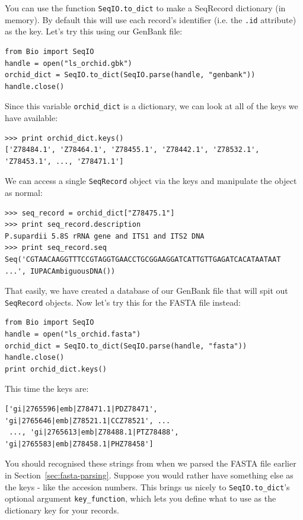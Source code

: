\documentclass{report}
\begin{document}
You can use the function \verb|SeqIO.to_dict| to make a SeqRecord dictionary (in memory).  By default this will use each record's identifier (i.e. the \verb|.id| attribute) as the key.  Let's try this using our GenBank file:

\begin{verbatim}
from Bio import SeqIO
handle = open("ls_orchid.gbk")
orchid_dict = SeqIO.to_dict(SeqIO.parse(handle, "genbank"))
handle.close()
\end{verbatim} 

Since this variable \verb|orchid_dict| is a dictionary, we can look at all of the keys we have available:

\begin{verbatim}
>>> print orchid_dict.keys()
['Z78484.1', 'Z78464.1', 'Z78455.1', 'Z78442.1', 'Z78532.1', 'Z78453.1', ..., 'Z78471.1']
\end{verbatim} 

We can access a single \verb|SeqRecord| object via the keys and manipulate the object as normal:

\begin{verbatim}
>>> seq_record = orchid_dict["Z78475.1"]
>>> print seq_record.description
P.supardii 5.8S rRNA gene and ITS1 and ITS2 DNA
>>> print seq_record.seq
Seq('CGTAACAAGGTTTCCGTAGGTGAACCTGCGGAAGGATCATTGTTGAGATCACATAATAAT ...', IUPACAmbiguousDNA())
\end{verbatim}

That easily, we have created a database of our GenBank file that will spit out \verb|SeqRecord| objects.  Now let's try this for the FASTA file instead:

\begin{verbatim}
from Bio import SeqIO
handle = open("ls_orchid.fasta")
orchid_dict = SeqIO.to_dict(SeqIO.parse(handle, "fasta"))
handle.close()
print orchid_dict.keys()
\end{verbatim} 

This time the keys are:

\begin{verbatim}
['gi|2765596|emb|Z78471.1|PDZ78471', 'gi|2765646|emb|Z78521.1|CCZ78521', ...
 ..., 'gi|2765613|emb|Z78488.1|PTZ78488', 'gi|2765583|emb|Z78458.1|PHZ78458']
\end{verbatim} 

You should recognised these strings from when we parsed the FASTA file earlier in Section~\ref{sec:fasta-parsing}.  Suppose you would rather have something else as the keys - like the accesion numbers.  This brings us nicely to \verb|SeqIO.to_dict|'s optional argument \verb|key_function|, which lets you define what to use as the dictionary key for your records.
\end{document}
